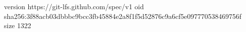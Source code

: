 version https://git-lfs.github.com/spec/v1
oid sha256:3f88acb03dbbbc9bcc3fb45884e2a8f1f5d52876c9a6cf5e097770538469756f
size 1322

